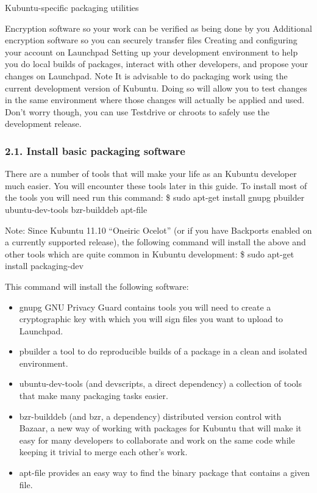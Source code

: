 \documentclass[letterpaper,10pt,english]{sphinxmanual}
\begin{document}
Kubuntu-specific packaging utilities

Encryption software so your work can be verified as being done by you
Additional encryption software so you can securely transfer files
Creating and configuring your account on Launchpad
Setting up your development environment to help you do local builds of packages, interact with other developers, and propose your changes on Launchpad.
Note
It is advisable to do packaging work using the current development version of Kubuntu. Doing so will allow you to test changes in the same environment where those changes will actually be applied and used.
Don’t worry though, you can use Testdrive or chroots to safely use the development release.


\subsubsection{2.1. Install basic packaging software}
\label{\detokenize{docs/packaging_guide/getting_started:install-basic-packaging-software}}
There are a number of tools that will make your life as an Kubuntu developer much easier. You will encounter these tools later in this guide. To install most of the tools you will need run this command:
\$ sudo apt-get install gnupg pbuilder ubuntu-dev-tools bzr-builddeb apt-file

Note: Since Kubuntu 11.10 “Oneiric Ocelot” (or if you have Backports enabled on a currently supported release), the following command will install the above and other tools which are quite common in Kubuntu development:
\$ sudo apt-get install packaging-dev

This command will install the following software:
\begin{itemize}
\item {} 
gnupg \textendash{} GNU Privacy Guard contains tools you will need to create a cryptographic key with which you will sign files you want to upload to Launchpad.

\item {} 
pbuilder \textendash{} a tool to do reproducible builds of a package in a clean and isolated environment.

\item {} 
ubuntu-dev-tools (and devscripts, a direct dependency) \textendash{} a collection of tools that make many packaging tasks easier.

\item {} 
bzr-builddeb (and bzr, a dependency) \textendash{} distributed version control with Bazaar, a new way of working with packages for Kubuntu that will make it easy for many developers to collaborate and work on the same code while keeping it trivial to merge each other’s work.

\item {} 
apt-file provides an easy way to find the binary package that contains a given file.

\end{itemize}
\end{document}
